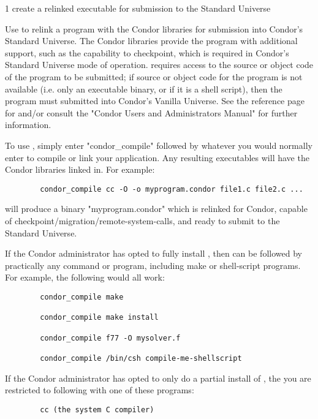 \begin{ManPage}{\label{man-condor-compile}}{1}
{create a relinked executable for submission to the Standard Universe}

\Synopsis {}

\Description


Use  to relink a program with the Condor libraries for
submission into Condor's Standard Universe.
The Condor libraries provide the program with additional support, such
as the capability to checkpoint, which is required in Condor's
Standard Universe mode of operation.
 requires access to the source or object code of the
program to be submitted; if source or object code for the program is
not available (i.e. only an executable binary, or if it is a shell
script), then the program must submitted into Condor's Vanilla
Universe.
See the reference page for  and/or consult the "Condor
Users and Administrators Manual" for further information.

To use , simply enter "condor\_compile" followed by
whatever you would normally enter to compile or link your
application.
Any resulting executables will have the Condor libraries linked in.
For example: 
\begin{verbatim}
        condor_compile cc -O -o myprogram.condor file1.c file2.c ... 
\end{verbatim}
will produce a binary "myprogram.condor" which is relinked for Condor,
capable of checkpoint/migration/remote-system-calls, and ready to
submit to the Standard Universe.  

If the Condor administrator has opted to fully install
, then  can be followed by practically
any command or program, including make or shell-script programs.
For example, the following would all work:
\begin{verbatim}
        condor_compile make 

        condor_compile make install 

        condor_compile f77 -O mysolver.f 

        condor_compile /bin/csh compile-me-shellscript 
\end{verbatim}

If the Condor administrator has opted to only do a partial install of
, the you are restricted to following 
with one of these programs:  
\begin{verbatim}
        cc (the system C compiler) 


\end{verbatim}
\end{ManPage}
